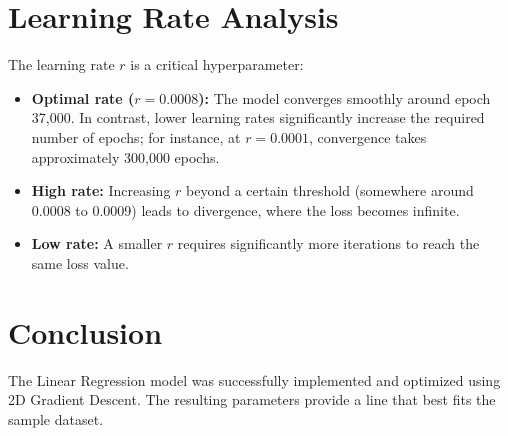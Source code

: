 \documentclass{article}
\begin{document}
\section{Learning Rate Analysis}
The learning rate $r$ is a critical hyperparameter:
\begin{itemize}
    \item \textbf{Optimal rate ($r = 0.0008$):} The model converges smoothly around epoch 37,000. In contrast, lower learning rates significantly increase the required number of epochs; for instance, at $r = 0.0001$, convergence takes approximately 300,000 epochs.
    \item \textbf{High rate:} Increasing $r$ beyond a certain threshold (somewhere around 0.0008 to 0.0009) leads to divergence, where the loss becomes infinite.
    \item \textbf{Low rate:} A smaller $r$ requires significantly more iterations to reach the same loss value.
\end{itemize}

\section{Conclusion}
The Linear Regression model was successfully implemented and optimized using 2D Gradient Descent. The resulting parameters provide a line that best fits the sample dataset.
\end{document}
